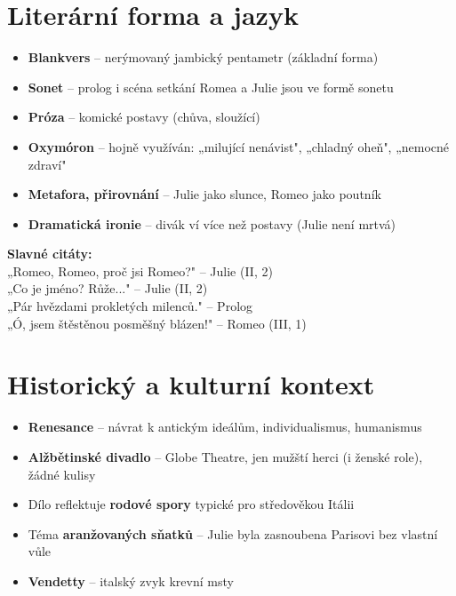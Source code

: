 \documentclass[12pt,a4paper]{article}
\begin{document}
\section{Literární forma a jazyk}

\begin{itemize}[leftmargin=1.5em]
  \item \textbf{Blankvers} – nerýmovaný jambický pentametr (základní forma)
  \item \textbf{Sonet} – prolog i scéna setkání Romea a Julie jsou ve formě sonetu
  \item \textbf{Próza} – komické postavy (chůva, sloužící)
  \item \textbf{Oxymóron} – hojně využíván: „milující nenávist", „chladný oheň", „nemocné zdraví"
  \item \textbf{Metafora, přirovnání} – Julie jako slunce, Romeo jako poutník
  \item \textbf{Dramatická ironie} – divák ví více než postavy (Julie není mrtvá)
\end{itemize}

\begin{citace}
\textbf{Slavné citáty:}\\[0.5em]
„Romeo, Romeo, proč jsi Romeo?" – Julie (II, 2)\\
„Co je jméno? Růže..." – Julie (II, 2)\\
„Pár hvězdami prokletých milenců." – Prolog\\
„Ó, jsem štěstěnou posměšný blázen!" – Romeo (III, 1)
\end{citace}

\section{Historický a kulturní kontext}

\begin{itemize}[leftmargin=1.5em]
  \item \textbf{Renesance} – návrat k antickým ideálům, individualismus, humanismus
  \item \textbf{Alžbětinské divadlo} – Globe Theatre, jen mužští herci (i ženské role), žádné kulisy
  \item Dílo reflektuje \textbf{rodové spory} typické pro středověkou Itálii
  \item Téma \textbf{aranžovaných sňatků} – Julie byla zasnoubena Parisovi bez vlastní vůle
  \item \textbf{Vendetty} – italský zvyk krevní msty
\end{itemize}
\end{document}
